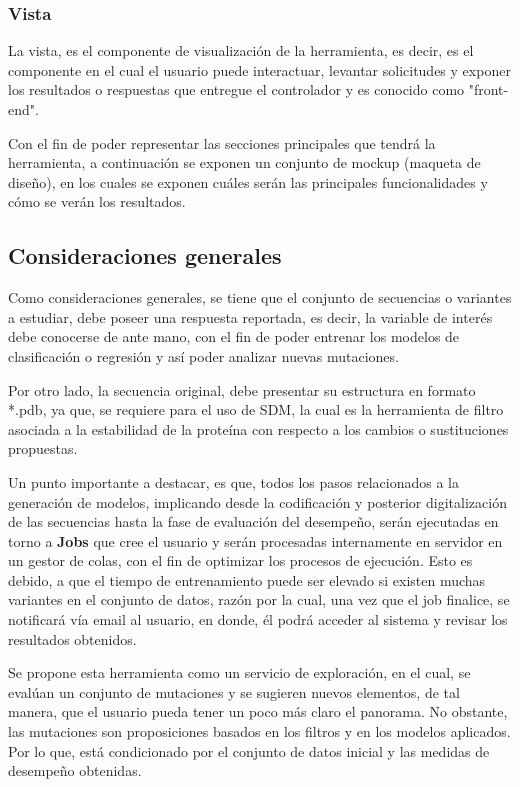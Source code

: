 \subsubsection{Vista}

La vista, es el componente de visualización de la herramienta, es decir, es el componente en el cual el usuario puede interactuar, levantar solicitudes y exponer los resultados o respuestas que entregue el controlador y es conocido como "front-end".

Con el fin de poder representar las secciones principales que tendrá la herramienta, a continuación se exponen un conjunto de mockup (maqueta de diseño), en los cuales se exponen cuáles serán las principales funcionalidades y cómo se verán los resultados.


\subsection{Consideraciones generales}

Como consideraciones generales, se tiene que el conjunto de secuencias o variantes a estudiar, debe poseer una respuesta reportada, es decir, la variable de interés debe conocerse de ante mano, con el fin de poder entrenar los modelos de clasificación o regresión y así poder analizar nuevas mutaciones. 

Por otro lado, la secuencia original, debe presentar su estructura en formato *.pdb, ya que, se requiere para el uso de SDM, la cual es la herramienta de filtro asociada a la estabilidad de la proteína con respecto a los cambios o sustituciones propuestas.

Un punto importante a destacar, es que, todos los pasos relacionados a la generación de modelos, implicando desde la codificación y posterior digitalización de las secuencias hasta la fase de evaluación del desempeño, serán ejecutadas en torno a \textbf{Jobs} que cree el usuario y serán procesadas internamente en servidor en un gestor de colas, con el fin de optimizar los procesos de ejecución. Esto es debido, a que el tiempo de entrenamiento puede ser elevado si existen muchas variantes en el conjunto de datos, razón por la cual, una vez que el job finalice, se notificará vía email al usuario, en donde, él podrá acceder al sistema y revisar los resultados obtenidos.

Se propone esta herramienta como un servicio de exploración, en el cual, se evalúan un conjunto de mutaciones y se sugieren nuevos elementos, de tal manera, que el usuario pueda tener un poco más claro el panorama. No obstante, las mutaciones son proposiciones basados en los filtros y en los modelos aplicados. Por lo que, está condicionado por el conjunto de datos inicial y las medidas de desempeño obtenidas. 
